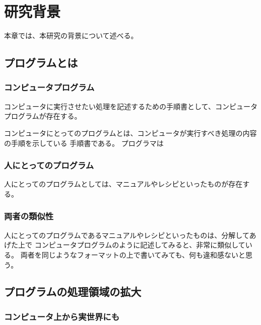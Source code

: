 \chapter{研究背景}
\label{chap:background}

本章では、本研究の背景について述べる。

\section{プログラムとは}\label{ux30d7ux30edux30b0ux30e9ux30e0ux3068ux306f}

\subsection{コンピュータプログラム}\label{ux30b3ux30f3ux30d4ux30e5ux30fcux30bfux30d7ux30edux30b0ux30e9ux30e0}

コンピュータに実行させたい処理を記述するための手順書として、コンピュータプログラムが存在する。

コンピュータにとってのプログラムとは、コンピュータが実行すべき処理の内容の手順を示している
手順書である。 プログラマは

\subsection{人にとってのプログラム}\label{ux4ebaux306bux3068ux3063ux3066ux306eux30d7ux30edux30b0ux30e9ux30e0}

人にとってのプログラムとしては、マニュアルやレシピといったものが存在する。

\subsection{両者の類似性}\label{ux4e21ux8005ux306eux985eux4f3cux6027}

人にとってのプログラムであるマニュアルやレシピといったものは、分解してあげた上で
コンピュータプログラムのように記述してみると、非常に類似している。
両者を同じようなフォーマットの上で書いてみても、何も違和感ないと思う。

\section{プログラムの処理領域の拡大}\label{ux30d7ux30edux30b0ux30e9ux30e0ux306eux51e6ux7406ux9818ux57dfux306eux62e1ux5927}

\subsection{コンピュータ上から実世界にも}\label{ux30b3ux30f3ux30d4ux30e5ux30fcux30bfux4e0aux304bux3089ux5b9fux4e16ux754cux306bux3082}

